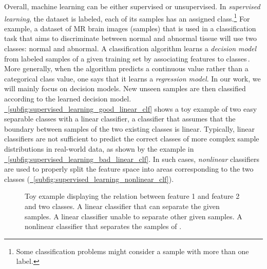 Overall, machine learning can be either supervised or unsupervised. In \emph{supervised learning}, the dataset is labeled, \ie each of its samples has an assigned class.\footnote{Some classification problems might consider a sample with more than one label.} For example, a dataset of MR brain images (samples) that is used in a classification task that aims to discriminate between normal and abnormal tissue will use two classes: normal and abnormal. A classification algorithm learns a \emph{decision model} from labeled samples of a given training set by associating features to classes\,\cite{Mello-2018-Book:ML}. More generally, when the algorithm predicts a continuous value rather than a categorical class value, one says that it learns a \emph{regression model}. In our work, we will mainly focus on decision models. New unseen samples are then classified according to the learned decision model. \hyperref[subfig:supervised_learning_good_linear_clf]{\fig~\ref{subfig:supervised_learning_good_linear_clf}} shows a toy example of two easy separable classes with a linear classifier, \ie a classifier that assumes that the boundary between samples of the two existing classes is linear. Typically, linear classifiers are not sufficient to predict the correct classes of more complex sample distributions in real-world data, as shown by the example in \hyperref[subfig:supervised_learning_bad_linear_clf]{\fig~\ref{subfig:supervised_learning_bad_linear_clf}}. In such cases, \emph{nonlinear} classifiers are used to properly split the feature space into areas corresponding to the two classes (\hyperref[subfig:supervised_learning_nonlinear_clf]{\fig~\ref{subfig:supervised_learning_nonlinear_clf}}).

\begin{figure}[!ht]
    \centering
    
    \caption[Supervised machine learning.]{Toy example displaying the relation between feature 1 and feature 2 and two classes.\protect\footnotemark\xspace {} A linear classifier that can separate the given samples.  A linear classifier unable to separate other given samples.  A nonlinear classifier that separates the samples of .}
    \label{fig:supervised_learning}
\end{figure}




